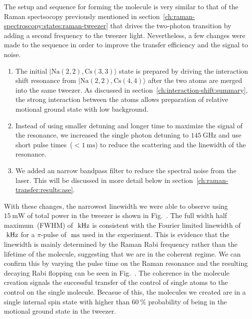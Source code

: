 The setup and sequence for forming the molecule is very similar to that of the Raman spectsocopy
previously mentioned in section~\ref{ch:raman-spectroscopy:states:raman-tweezer}
that drives the two-photon transition by adding a second frequency to the tweezer light.
Nevertheless, a few changes were made to the sequence in order to improve
the transfer efficiency and the signal to noise.
\begin{enumerate}
\item The initial $|\mathrm{Na(2,2),Cs(3,3)}\rangle$ state is prepared by driving the
  interaction shift resonance from $|\mathrm{Na(2,2),Cs(4,4)}\rangle$
  after the two atoms are merged into the same tweezer.
  As discussed in section~\ref{ch:interaction-shift:summary},
  the strong interaction between the atoms allows preparation of
  relative motional ground state with low background.
\item Instead of using smaller detuning and longer time to maximize the signal of the resonance,
  we increased the single photon detuning to $145~\mathrm{GHz}$
  and use short pulse times~($<\!1~\mathrm{ms}$)
  to reduce the scattering and the linewidth of the resonance.
\item We added an narrow bandpass filter to reduce the spectral noise from the laser.
  This will be discussed in more detail below in section~\ref{ch:raman-transfer:results:ase}.
\end{enumerate}

With these changes, the narrowest linewidth we were able to observe using $15~\mathrm{mW}$
of total power in the tweezer is shown in Fig.~.
The full width half maximum~(FWHM) of $\todo{number}~\mathrm{kHz}$ is consistent
with the Fourier limited linewidth of $\todo{number}~\mathrm{kHz}$
for a $\pi$-pulse of $\todo{number}~\mathrm{ms}$ used in the experiment.
This is evidence that the linewidth is mainly determined by the Raman Rabi frequency
rather than the lifetime of the molecule, suggesting that we are in the coherent regime.
We can confirm this by varying the pulse time on the Raman resonance
and the resulting decaying Rabi flopping can be seen in Fig.~.
The coherence in the molecule creation signals the successful transfer
of the control of single atoms to the control on the single molecule.
Becasue of this, the molecules we created are in a single internal spin state
with higher than $60~\mathrm{\%}$ probability
of being in the motional ground state in the tweezer.

